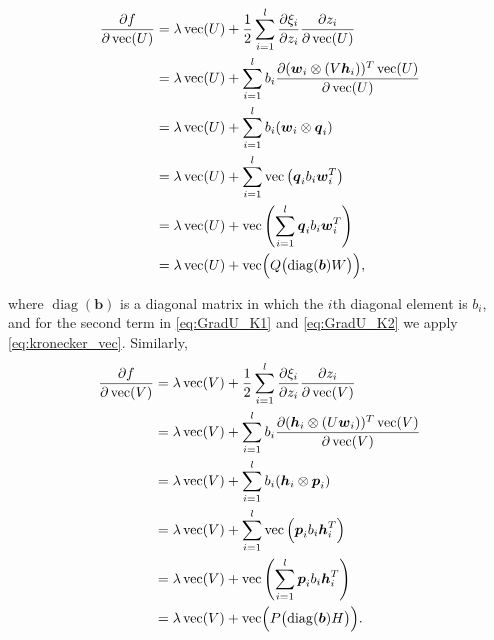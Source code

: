 \documentclass[11pt,twoside]{article}
\newcommand{\bsym}[1]{\ensuremath{\boldsymbol{#1}}}
\newcommand{\bw}{\ensuremath{\bsym{w}}}
\newcommand{\bj}{\ensuremath{\bsym{j}}}
\newcommand{\bp}{\ensuremath{\bsym{p}}}
\newcommand{\bq}{\ensuremath{\bsym{q}}}
\newcommand{\bh}{\ensuremath{\bsym{h}}}
\DeclareMathOperator*{\diag}{diag}
\DeclareMathOperator*{\vectorize}{vec}
\begin{document}
\begin{align}
\frac{\partial f}{\partial \vectorize(U)} 
&= \lambda \vectorize(U) + \frac{1}{2}\sum_{i=1}^{l} \pdv{\xi_i}{z_i} \frac{\partial z_i}{\partial \vectorize(U)} \nonumber\\
&= \lambda \vectorize(U) + \sum_{i=1}^{l}b_i \frac{\partial (\bw_i \otimes (V \bh_i))^T\vectorize(U)}{\partial \vectorize(U)}\nonumber \\
&=\lambda \vectorize(U) +  \sum_{i=1}^l b_i (\bw_i\otimes\bq_i)\label{eq:GradU_K1} \\
&=\lambda \vectorize(U) +  \sum_{i=1}^l \vectorize\left(\bq_i b_i \bw_i^T \right) \label{eq:GradU_K2}\\
&=\lambda \vectorize(U) +  \vectorize\left( \sum_{i=1}^l \bq_i b_i \bw_i^T \right) \nonumber\\
&=\lambda \vectorize(U) +  \vectorize \Bigl ( Q \bigl(\diag(\bsym{b}) W \bigr)  \Bigr)\label{eq:GradU},
\end{align}

where $\diag(\bsym{b})$ is a diagonal matrix in which the $i$th diagonal element is $b_i$, and for the second term in \eqref{eq:GradU_K1} and \eqref{eq:GradU_K2} we apply \eqref{eq:kronecker_vec}. Similarly,
\begin{align}
\frac{\partial f}{\partial \vectorize(V)} 
&= \lambda \vectorize(V) + \frac{1}{2}\sum_{i=1}^{l} \pdv{\xi_i}{z_i} \frac{\partial z_i}{\partial \vectorize(V)} \nonumber\\
&= \lambda \vectorize(V) + \sum_{i=1}^{l}b_i \frac{\partial (\bh_i \otimes (U \bw_i))^T\vectorize(V)}{\partial \vectorize(V)}\nonumber \\
&=\lambda \vectorize(V) +  \sum_{i=1}^l b_i (\bh_i\otimes\bp_i)\nonumber \\
&=\lambda \vectorize(V) +  \sum_{i=1}^l \vectorize\left(\bp_i b_i \bh_i^T \right) \nonumber\\
&=\lambda \vectorize(V) +  \vectorize\left(\sum_{i=1}^l \bp_i b_i \bh_i^T \right) \nonumber\\
&=\lambda \vectorize(V) +  \vectorize \Bigl ( P \bigl(\diag(\bsym{b}) H \bigr)  \Bigr)\label{eq:GradV}.
\end{align}
\end{document}
